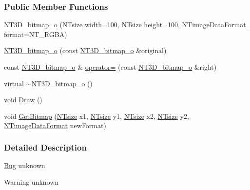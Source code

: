 \subsubsection*{Public Member Functions}
\begin{DoxyCompactItemize}
\item 
\hyperlink{class_n_t3_d__bitmap__o_a1da91bf57b5928af10b40894ef7b077d}{NT3D\_\-bitmap\_\-o} (\hyperlink{nt__types_8h_a06c124f2e4469769b58230253ce0560b}{NTsize} width=100, \hyperlink{nt__types_8h_a06c124f2e4469769b58230253ce0560b}{NTsize} height=100, \hyperlink{nt__codes_8h_ad1bb9d54b61901f8e764e6cf0694e52f}{NTimageDataFormat} format=NT\_\-RGBA)
\item 
\hyperlink{class_n_t3_d__bitmap__o_a29b2771c2f3fdf24975aa1446c411bcd}{NT3D\_\-bitmap\_\-o} (const \hyperlink{class_n_t3_d__bitmap__o}{NT3D\_\-bitmap\_\-o} \&original)
\item 
const \hyperlink{class_n_t3_d__bitmap__o}{NT3D\_\-bitmap\_\-o} \& \hyperlink{class_n_t3_d__bitmap__o_a322fdf9c9a5eef37cd58f344e1ce875f}{operator=} (const \hyperlink{class_n_t3_d__bitmap__o}{NT3D\_\-bitmap\_\-o} \&right)
\item 
virtual \hyperlink{class_n_t3_d__bitmap__o_a2bf792f3064e743b45dc2ee3314db62e}{$\sim$NT3D\_\-bitmap\_\-o} ()
\item 
void \hyperlink{class_n_t3_d__bitmap__o_acc190c3b2fd628d32d44f6fac54ea462}{Draw} ()
\item 
void \hyperlink{class_n_t3_d__bitmap__o_a7c5cbbfdfbd3fd4653da6e5fb5bc5fb3}{GetBitmap} (\hyperlink{nt__types_8h_a06c124f2e4469769b58230253ce0560b}{NTsize} x1, \hyperlink{nt__types_8h_a06c124f2e4469769b58230253ce0560b}{NTsize} y1, \hyperlink{nt__types_8h_a06c124f2e4469769b58230253ce0560b}{NTsize} x2, \hyperlink{nt__types_8h_a06c124f2e4469769b58230253ce0560b}{NTsize} y2, \hyperlink{nt__codes_8h_ad1bb9d54b61901f8e764e6cf0694e52f}{NTimageDataFormat} newFormat)
\end{DoxyCompactItemize}


\subsubsection{Detailed Description}
\begin{Desc}
\item[\hyperlink{bug__bug000007}{Bug}]unknown \end{Desc}
\begin{DoxyWarning}{Warning}
unknown 
\end{DoxyWarning}



